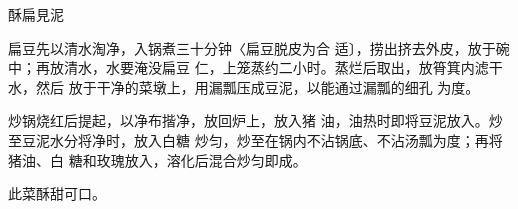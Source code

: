 \begin{recipe}{酥扁見泥}

\ingredients


\cooking

\step 扁豆先以清水淘净，入锅煮三十分钟〈扁豆脱皮为合 适〕，捞出挤去外皮，放于碗中；再放清水，水要淹没扁豆 仁，上笼蒸约二小时。蒸烂后取出，放筲箕内滤干水，然后 放于干净的菜墩上，用漏瓢压成豆泥，以能通过漏瓢的细孔 为度。

\step 炒锅烧红后提起，以净布揩净，放回炉上，放入猪 油，油热时即将豆泥放入。炒至豆泥水分将净时，放入白糖 炒匀，炒至在锅内不沾锅底、不沾汤瓢为度；再将猪油、白 糖和玫瑰放入，溶化后混合炒匀即成。

\notes

此菜酥甜可口。

\end{recipe}

